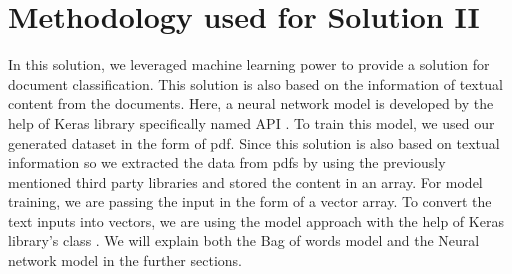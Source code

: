 \section{Methodology used for Solution II}
In this solution, we leveraged machine learning power to provide a solution for document classification. This solution is also based on the information of textual content from the documents. Here, a neural network model is developed by the help of Keras library specifically named  API \cite{seq_api}. To train this model, we used our generated dataset in the form of pdf. Since this solution is also based on textual information so we extracted the data from pdfs by using the previously mentioned third party libraries and stored the content in an array. For model training, we are passing the input in the form of a vector array. To convert the text inputs into vectors, we are using the  model \cite{bow} approach with the help of Keras library's class  \cite{tokenizer}. We will explain both the Bag of words model and the Neural network model in the further sections.

